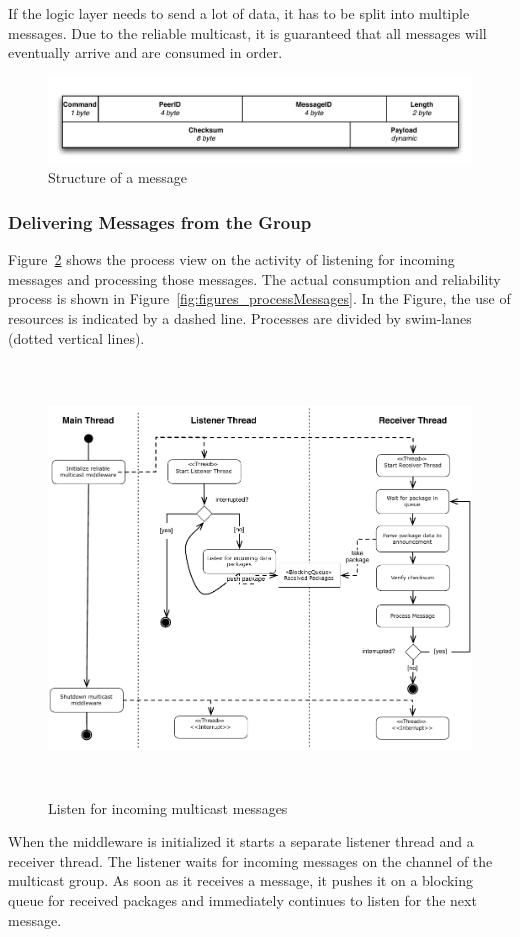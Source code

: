 If the logic layer needs to send a lot of data, it has to be split into multiple messages. Due to the reliable multicast, it is guaranteed that all messages will eventually arrive and are consumed in order.

\begin{figure}[htbp]
    \centering
        \includegraphics[width=.9\textwidth]{figures/message.pdf}
    \caption{Structure of a message}
    \label{fig:messages}
\end{figure}

\subsubsection{Delivering Messages from the Group}
Figure~\ref{fig:figures_processReceivePackage} shows the process view on the activity of listening for incoming messages and processing those messages. The actual consumption and reliability process is shown in Figure~\ref{fig:figures_processMessages}.
In the Figure, the use of resources is indicated by a dashed line. Processes are divided by swim-lanes (dotted vertical lines).

\begin{figure}[H]
    \centering
        \includegraphics[height=4.5in]{figures/receivePackets.pdf}
    \caption{Listen for incoming multicast messages}
    \label{fig:figures_processReceivePackage}
\end{figure}
When the middleware is initialized it starts a separate listener thread and a receiver thread. The listener waits for incoming messages on the channel of the multicast group. As soon as it receives a message, it pushes it on a blocking queue for received packages and immediately continues to listen for the next message. 

